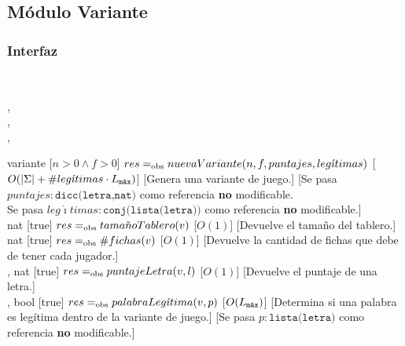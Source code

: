 \subsection{Módulo Variante}
\begin{interfaz}{\subsubsection{Interfaz}}
  \\
  \par\noindent
  \begin{operaciones}
    {
      \begin{adjustwidth}{2em}{}
      ,\\
      ,\\
      ,\\
      \end{adjustwidth}
    }{variante}
    [$n>0\land f>0$]
    {$res\igobs nuevaVariante(n,f,puntajes,leg\acute{\imath}timas)$}
    [$O(|\Sigma|+\#leg\acute{\imath}timas\cdot\Lmax)$]
    [Genera una variante de juego.]
    [Se pasa $puntajes:\texttt{dicc(letra,nat)}$ como referencia \textbf{no} modificable.\\
    \-\hspace{4.7em}Se pasa $leg\acute\imath timas:\texttt{conj(lista(letra))}$ como referencia \textbf{no} modificable.]\\

    \noindent{}
    {}{nat}
    [true]
    {$res\igobs tama\tilde{n}oTablero(v)$}
    [$O(1)$]
    [Devuelve el tamaño del tablero.]\\

    \noindent{}
    {}{nat}
    [true]
    {$res\igobs \#fichas(v)$}
    [$O(1)$]
    [Devuelve la cantidad de fichas que debe de tener cada jugador.]\\

    \noindent{}
    {, }{nat}
    [true]
    {$res\igobs puntajeLetra(v,l)$}
    [$O(1)$]
    [Devuelve el puntaje de una letra.]\\

    \noindent{}
    {, }{bool}
    [true]
    {$res\igobs palabraLeg\acute{\imath}tima(v,p)$}
    [$O(\Lmax)$]
    [Determina si una palabra es legítima dentro de la variante de juego.]
    [Se pasa $p:\texttt{lista(letra)}$ como referencia \textbf{no} modificable.]\\


\end{operaciones}
\end{interfaz}
